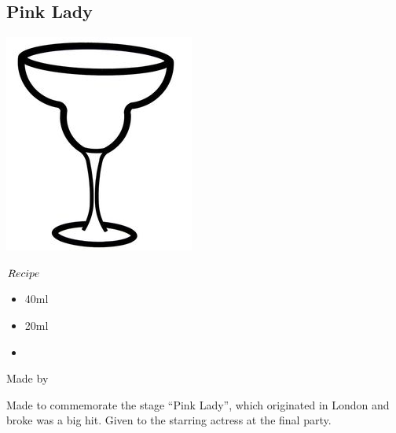 \subsection{Pink Lady}
\vspace{-7mm}
\hspace{33mm}
\includegraphics[scale=.05]{cocktail_glass_snow.jpg}
\vspace{2.5mm}
\begin{itembox}[l]{\boldmath $Recipe$}
\begin{itemize}
\setlength{\parskip}{0cm}
\setlength{\itemsep}{0cm}
\item \gin 40ml
\item \gs 20ml
\item {}
\end{itemize}
\vspace{-4mm}
Made by \shake
\end{itembox}
Made to commemorate the stage ``Pink Lady'', which originated in London and broke was a big hit. Given to the starring actress at the final party.
